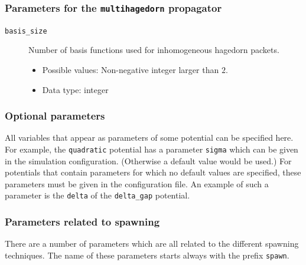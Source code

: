 \documentclass[a4paper,10pt]{report}
\begin{document}
\subsubsection{Parameters for the \texttt{multihagedorn} propagator}

\begin{description}
  \item[\texttt{basis\_size}] Number of basis functions used for inhomogeneous hagedorn packets.
  \begin{itemize}
    \item Possible values: Non-negative integer larger than $2$.
    \item Data type: integer
  \end{itemize}
\end{description}

\subsubsection{Optional parameters}

All variables that appear as parameters of some potential can be specified
here. For example, the \texttt{quadratic} potential has a parameter \texttt{sigma}
which can be given in the simulation configuration. (Otherwise a default value
would be used.) For potentials that contain parameters for which no default
values are specified, these parameters must be given in the configuration file.
An example of such a parameter is the \texttt{delta} of the \texttt{delta\_gap} potential.

\subsubsection{Parameters related to spawning}

There are a number of parameters which are all related to the different
spawning techniques. The name of these parameters starts always with the prefix
\texttt{spawn}.
\end{document}
